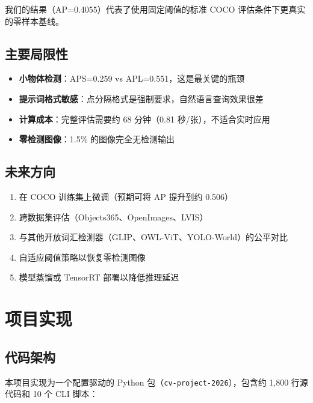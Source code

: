 \documentclass[12pt,a4paper]{ctexart}
\begin{document}
我们的结果（AP=0.4055）代表了使用固定阈值的标准 COCO 评估条件下更真实的零样本基线。

\subsection{主要局限性}

\begin{itemize}
    \item \textbf{小物体检测}：APS=0.259 vs APL=0.551，这是最关键的瓶颈
    \item \textbf{提示词格式敏感}：点分隔格式是强制要求，自然语言查询效果很差
    \item \textbf{计算成本}：完整评估需要约 68 分钟（0.81 秒/张），不适合实时应用
    \item \textbf{零检测图像}：1.5\% 的图像完全无检测输出
\end{itemize}

\subsection{未来方向}

\begin{enumerate}
    \item 在 COCO 训练集上微调（预期可将 AP 提升到约 0.506）
    \item 跨数据集评估（Objects365、OpenImages、LVIS）
    \item 与其他开放词汇检测器（GLIP、OWL-ViT、YOLO-World）的公平对比
    \item 自适应阈值策略以恢复零检测图像
    \item 模型蒸馏或 TensorRT 部署以降低推理延迟
\end{enumerate}

\section{项目实现}

\subsection{代码架构}

本项目实现为一个配置驱动的 Python 包（\texttt{cv-project-2026}），包含约 1,800 行源代码和 10 个 CLI 脚本：
\end{document}
